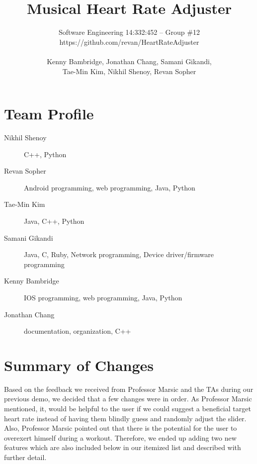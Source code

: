 \documentclass[letterpaper,english, 12pt]{scrreprt}
\title{Musical Heart Rate Adjuster}
\author{Software Engineering 14:332:452 -- Group \#12 \\ https://github.com/revan/HeartRateAdjuster \\ 
\\Kenny Bambridge, Jonathan Chang, Samani Gikandi,
\\Tae-Min Kim, Nikhil Shenoy, Revan Sopher}
\begin{document}
\maketitle

\tableofcontents

\section*{Team Profile}
\begin{description}
	\item[Nikhil Shenoy] C++, Python
	\item[Revan Sopher] Android programming, web programming, Java, Python
	\item[Tae-Min Kim] Java, C++, Python
	\item[Samani Gikandi] Java, C, Ruby, Network programming, Device driver/firmware programming
	\item[Kenny Bambridge] IOS programming, web programming, Java, Python
	\item[Jonathan Chang] documentation, organization, C++
\end{description}

\section*{Summary of Changes}

Based on the feedback we received from Professor Marsic and the TAs during our previous demo, we decided that a few changes were in order. As Professor Marsic mentioned, it, would be helpful to the user if we could suggest a beneficial target heart rate instead of having them blindly guess and randomly adjust the slider. Also, Professor Marsic pointed out that there is the potential for the user to overexert himself during a workout. Therefore, we ended up adding two new features which are also included below in our itemized list and described with further detail. 
\end{document}
